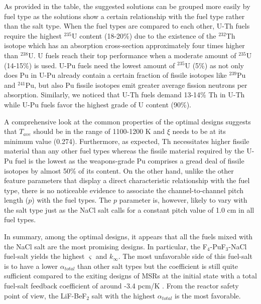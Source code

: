     As provided in the table, the suggested solutions can be grouped more easily by fuel type as the solutions show a certain relationship with the fuel type rather than the salt type. When the fuel types are compared to each other, U-Th fuels require the highest $^{235}$U content (18-20\%) due to the existence of the $^{232}$Th isotope which has an absorption cross-section approximately four times higher than $^{238}$U. U fuels reach their top performance when a moderate amount of $^{235}$U (14-15\%) is used. U-Pu fuels need the lowest amount of $^{235}$U (5\%) as not only does Pu in U-Pu already contain a certain fraction of fissile isotopes like $^{239}$Pu and $^{241}$Pu, but also Pu fissile isotopes emit greater average fission neutrons per absorption. Similarly, we noticed that U-Th fuels demand 13-14\% Th in U-Th while U-Pu fuels favor the highest grade of U content (90\%).

    A comprehensive look at the common properties of the optimal designs suggests that $T_{ave}$ should be in the range of 1100-1200 K and $\xi$ needs to be at its minimum value (0.274). Furthermore, as expected, Th necessitates higher fissile material than any other fuel types whereas the fissile material required by the U-Pu fuel is the lowest as the weapons-grade Pu comprises a gread deal of fissile isotopes by almost 50\% of its content. On the other hand, unlike the other feature parameters that display a direct characteristic relationship with the fuel type, there is no noticeable evidence to associate the channel-to-channel pitch length ($p$) with the fuel types. The $p$ parameter is, however, likely to vary with the salt type just as the NaCl salt calls for a constant pitch value of 1.0 cm in all fuel types.

    In summary, among the optimal designs, it appears that all the fuels mixed with the NaCl salt are the most promising designs. In particular, the F$_4$-PuF$_3$-NaCl fuel-salt yields the highest $\varsigma$ and $k_{\infty}$. The most unfavorable side of this fuel-salt is to have a lower ${\alpha_{total}}$ than other salt types but the coefficient is still quite sufficient compared to the exiting designs of \gls{MSR}s at the initial state with a total fuel-salt feedback coefficient of around -3.4 pcm/K \cite{rykhlevskii2019, robertson1971}. From the reactor safety point of view, the LiF-BeF$_2$ salt with the highest ${\alpha_{total}}$ is the most favorable.

